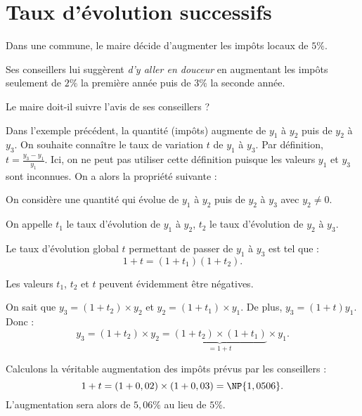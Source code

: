 \documentclass[10pt,openright,twoside,french]{book}
\begin{document}
\section{Taux d'évolution successifs}

\begin{Exemple}
    Dans une commune, le maire décide d'augmenter les impôts locaux de $5\%$.\par
    Ses conseillers lui suggèrent \textit{d'y aller en douceur} en augmentant les impôts seulement de $2\%$ la première année puis de $3\%$ la seconde année.\par
    Le maire doit-il suivre l'avis de ses conseillers ?
\end{Exemple}\medskip

Dans l'exemple précédent, la quantité (impôts) augmente de $y_1$ à $y_2$ puis de $y_2$ à $y_3$. On souhaite connaître le taux de variation $t$ de $y_1$ à $y_3$. Par définition, $t = \frac{y_3 - y_1}{y_1}$. Ici, on ne peut pas utiliser cette définition puisque les valeurs $y_1$ et $y_3$ sont inconnues. On a alors la propriété suivante :\medskip

\begin{Prop}
    On considère une quantité qui évolue de $y_1$ à $y_2$ puis de $y_2$ à $y_3$ avec $y_2 \neq 0$.\par
    On appelle $t_1$ le taux d'évolution de $y_1$ à $y_2$, $t_2$ le taux d'évolution de $y_2$ à $y_3$.\par
    Le taux d'évolution global $t$ permettant de passer de $y_1$ à $y_3$ est tel que :\[1+t = (1 + t_1)(1 + t_2).\]
\end{Prop}

\begin{Rmq}
    Les valeurs $t_1$, $t_2$ et $t$ peuvent évidemment être négatives.
\end{Rmq}

\begin{Demo}
    On sait que $y_3 = (1+t_2) \times y_2$ et $y_2 = (1+t_1)\times y_1$. De plus, $y_3 = (1+t)y_1$. Donc :
    \[y_3 = (1+t_2) \times y_2 = \underbrace{(1 + t_2) \times (1 + t_1)}_{= 1 + t} \times y_1.\]
\end{Demo}

\begin{Exemple}
    Calculons la véritable augmentation des impôts prévus par les conseillers :
    \[1 + t = (1+0,02) \times (1+0,03) = \NP{1,0506}.\]
    L'augmentation sera alors de $5,06\%$ au lieu de $5\%$.
\end{Exemple}
\end{document}
